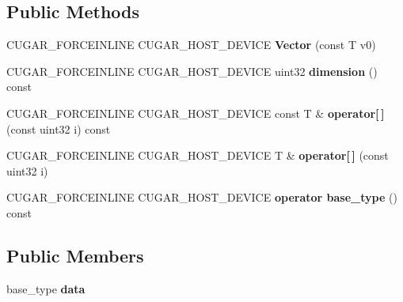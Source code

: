 \subsection*{Public Methods}
\begin{DoxyCompactItemize}
\item 
\mbox{\label{structcugar_1_1_vector_3_01_t_00_011_01_4_ad1044edc585ef9509bc822f2bfb8e779}} 
C\+U\+G\+A\+R\+\_\+\+F\+O\+R\+C\+E\+I\+N\+L\+I\+NE C\+U\+G\+A\+R\+\_\+\+H\+O\+S\+T\+\_\+\+D\+E\+V\+I\+CE {\bfseries Vector} (const T v0)
\item 
\mbox{\label{structcugar_1_1_vector_3_01_t_00_011_01_4_aa9cfb497f8b4507d7956a46e9893ff91}} 
C\+U\+G\+A\+R\+\_\+\+F\+O\+R\+C\+E\+I\+N\+L\+I\+NE C\+U\+G\+A\+R\+\_\+\+H\+O\+S\+T\+\_\+\+D\+E\+V\+I\+CE uint32 {\bfseries dimension} () const
\item 
\mbox{\label{structcugar_1_1_vector_3_01_t_00_011_01_4_a5cc8fc684e44a2cd67c496879533a6af}} 
C\+U\+G\+A\+R\+\_\+\+F\+O\+R\+C\+E\+I\+N\+L\+I\+NE C\+U\+G\+A\+R\+\_\+\+H\+O\+S\+T\+\_\+\+D\+E\+V\+I\+CE const T \& {\bfseries operator\mbox{[}$\,$\mbox{]}} (const uint32 i) const
\item 
\mbox{\label{structcugar_1_1_vector_3_01_t_00_011_01_4_a76863fce16e18460995c5bf5979ccf5b}} 
C\+U\+G\+A\+R\+\_\+\+F\+O\+R\+C\+E\+I\+N\+L\+I\+NE C\+U\+G\+A\+R\+\_\+\+H\+O\+S\+T\+\_\+\+D\+E\+V\+I\+CE T \& {\bfseries operator\mbox{[}$\,$\mbox{]}} (const uint32 i)
\item 
\mbox{\label{structcugar_1_1_vector_3_01_t_00_011_01_4_a5f3c288ea01ba2b4251b0ff18ed26afc}} 
C\+U\+G\+A\+R\+\_\+\+F\+O\+R\+C\+E\+I\+N\+L\+I\+NE C\+U\+G\+A\+R\+\_\+\+H\+O\+S\+T\+\_\+\+D\+E\+V\+I\+CE {\bfseries operator base\+\_\+type} () const
\end{DoxyCompactItemize}
\subsection*{Public Members}
\begin{DoxyCompactItemize}
\item 
\mbox{\label{structcugar_1_1_vector_3_01_t_00_011_01_4_a14f13440cea9ded0753406022c0b1e93}} 
base\+\_\+type {\bfseries data}
\end{DoxyCompactItemize}
